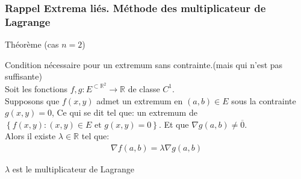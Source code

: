 \subsubsection{Rappel Extrema liés. Méthode des multiplicateur de Lagrange}

\begin{parag}{Théorème (cas $n = 2$)}
    \begin{theoreme}
        Condition nécessaire pour un extremum sans contrainte.(mais qui n'est pas suffisante)\\
        Soit les fonctions $f, g: E^{\subset \mathbb{R}^2} \to \mathbb{R}$ de classe $C^1$.\\
        Supposons que $f\left(x, y\right)$ admet un extremum en $\left(a, b\right) \in E$ sous la contrainte $g\left(x, y\right) = 0$, Ce qui se dit tel que:
        un extremum de $\left\{f\left(x,y\right): \left(x, y\right) \in E \text{ et } g\left(x, y\right) = 0\right\}$. Et que $\nabla g\left(a, b\right) \neq \overline{0}$. \\
        Alors il existe $\lambda \in \mathbb{R}$ tel que:
        \begin{align*} 
            \nabla f\left(a, b\right) = \lambda \nabla g\left(a, b\right)
        \end{align*}
    \end{theoreme}
    
    \begin{definition}
        $\lambda$ est le multiplicateur de Lagrange
    \end{definition}
\end{parag}
